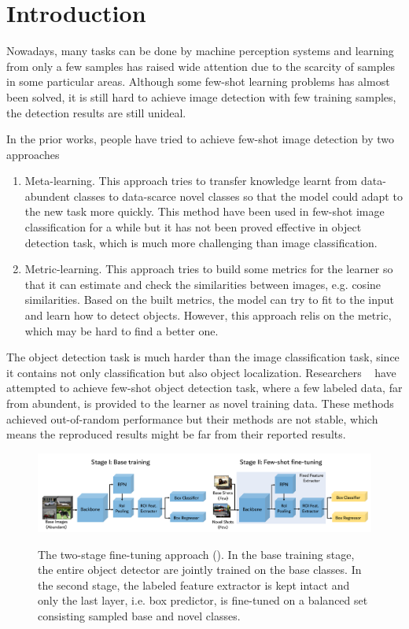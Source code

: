\section{Introduction}
Nowadays, many tasks can be done by machine perception systems and learning from only a few samples has raised wide attention due to the scarcity of samples in some particular areas. Although some few-shot learning problems has almost been solved, it is still hard to achieve image detection with few training samples, the detection results are still unideal.

In the prior works, people have tried to achieve few-shot image detection by two approaches
\begin{enumerate}
    \item Meta-learning. This approach tries to transfer knowledge learnt from data-abundent classes to data-scarce novel classes so that the model could adapt to the new task more quickly. This method have been used in few-shot image classification for a while but it has not been proved effective in object detection task, which is much more challenging than image classification.
    \item Metric-learning. This approach tries to build some metrics for the learner so that it can estimate and check the similarities between images, e.g. cosine similarities. Based on the built metrics, the model can try to fit to the input and learn how to detect objects. However, this approach relis on the metric, which may be hard to find a better one.
\end{enumerate}

The object detection task is much harder than the image classification task, since it contains not only classification but also object localization. Researchers ~\cite{kang2019few,yan2019meta,wang2019meta} have attempted to achieve few-shot object detection task, where a few labeled data, far from abundent, is provided to the learner as novel training data. These methods achieved out-of-random performance but their methods are not stable, which means the reproduced results might be far from their reported results.

\begin{figure}[ht]
    \centering
    \includegraphics[width=\linewidth]{figs/TFA_fig1.pdf}
    \label{fig:tfa_arch}
    \vspace{-0.8cm}
    \caption{The two-stage fine-tuning approach (\model). In the base training stage, the entire object detector are jointly trained on the base classes. In the second stage, the labeled feature extractor is kept intact and only the last layer, i.e. box predictor, is fine-tuned on a balanced set consisting sampled base and novel classes.}
\end{figure}

